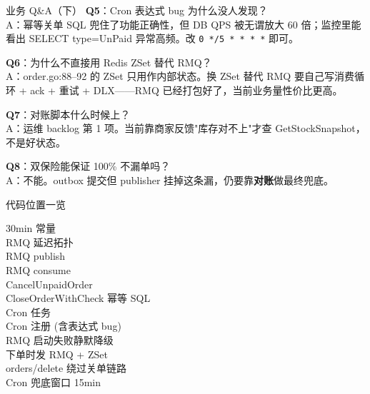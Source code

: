 \begin{frame}{业务 Q\&A（下）}
\textbf{Q5}：Cron 表达式 bug 为什么没人发现？\\
\hspace{4mm}\small A：幂等关单 SQL 兜住了功能正确性，但 DB QPS 被无谓放大 60 倍；监控里能看出 SELECT type=UnPaid 异常高频。改 \texttt{0 */5 * * * *} 即可。

\vspace{2mm}
\textbf{Q6}：为什么不直接用 Redis ZSet 替代 RMQ？\\
\hspace{4mm}\small A：order.go:88--92 的 ZSet 只用作内部状态。换 ZSet 替代 RMQ 要自己写消费循环 + ack + 重试 + DLX——RMQ 已经打包好了，当前业务量性价比更高。

\vspace{2mm}
\textbf{Q7}：对账脚本什么时候上？\\
\hspace{4mm}\small A：运维 backlog 第 1 项。当前靠商家反馈"库存对不上"才查 GetStockSnapshot，不是好状态。

\vspace{2mm}
\textbf{Q8}：双保险能保证 100\% 不漏单吗？\\
\hspace{4mm}\small A：不能。outbox 提交但 publisher 挂掉这条漏，仍要靠\textbf{对账}做最终兜底。
\end{frame}

\begin{frame}{代码位置一览}
\begin{description}
  \item[30min 常量]
  \item[RMQ 延迟拓扑]
  \item[RMQ publish]
  \item[RMQ consume]
  \item[CancelUnpaidOrder]
  \item[CloseOrderWithCheck 幂等 SQL]
  \item[Cron 任务]
  \item[Cron 注册 (含表达式 bug)]
  \item[RMQ 启动失败静默降级]
  \item[下单时发 RMQ + ZSet]
  \item[orders/delete 绕过关单链路]
  \item[Cron 兜底窗口 15min]
\end{description}
\end{frame}


